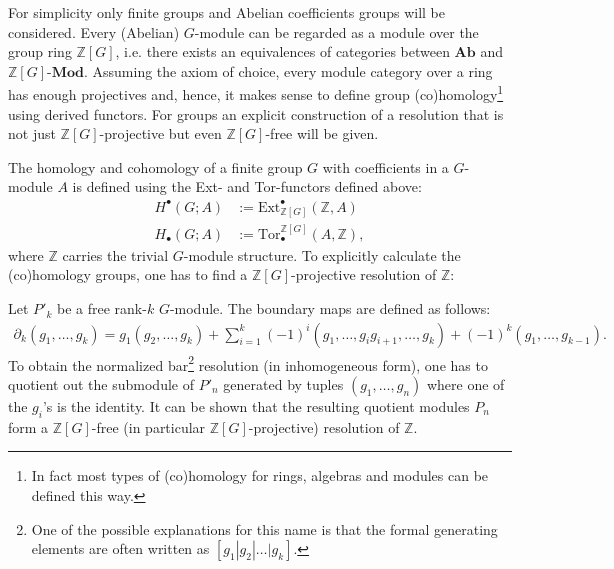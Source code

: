 	For simplicity only finite groups and Abelian coefficients groups will be considered. Every (Abelian) $G$-module can be regarded as a module over the group ring $\mathbb{Z}[G]$, i.e. there exists an equivalences of categories between $\mathbf{Ab}$ and $\mathbb{Z}[G]$-$\mathbf{Mod}$. Assuming the axiom of choice, every module category over a ring has enough projectives and, hence, it makes sense to define group (co)homology\footnote{In fact most types of (co)homology for rings, algebras and modules can be defined this way.} using derived functors. For groups an explicit construction of a resolution that is not just $\mathbb{Z}[G]$-projective but even $\mathbb{Z}[G]$-free will be given.

	The homology and cohomology of a finite group $G$ with coefficients in a $G$-module $A$ is defined using the Ext- and Tor-functors defined above:
	\begin{align}
		H^\bullet(G; A) &:= \text{Ext}_{\mathbb{Z}[G]}^\bullet(\mathbb{Z}, A)\\
		H_\bullet(G; A) &:= \text{Tor}^{\mathbb{Z}[G]}_\bullet(A, \mathbb{Z}),
	\end{align}
	where $\mathbb{Z}$ carries the trivial $G$-module structure. To explicitly calculate the (co)homology groups, one has to find a $\mathbb{Z}[G]$-projective resolution of $\mathbb{Z}$:
	\begin{construct}
		Let $P'_k$ be a free rank-$k$ $G$-module. The boundary maps are defined as follows:
		\begin{gather}
			\label{homalg:group_boundary}
			\partial_k(g_1,\ldots,g_k) = g_1(g_2,\ldots,g_k) + \sum_{i=1}^k (-1)^i(g_1,\ldots,g_ig_{i+1},\ldots,g_k) + (-1)^k (g_1,\ldots,g_{k-1}).
		\end{gather}
		To obtain the normalized bar\footnote{One of the possible explanations for this name is that the formal generating elements are often written as $[g_1|g_2|\ldots|g_k]$.} resolution (in inhomogeneous form), one has to quotient out the submodule of $P'_n$ generated by tuples $(g_1,\ldots,g_n)$ where one of the $g_i$'s is the identity. It can be shown that the resulting quotient modules $P_n$ form a $\mathbb{Z}[G]$-free (in particular $\mathbb{Z}[G]$-projective) resolution of $\mathbb{Z}$.
	\end{construct}

